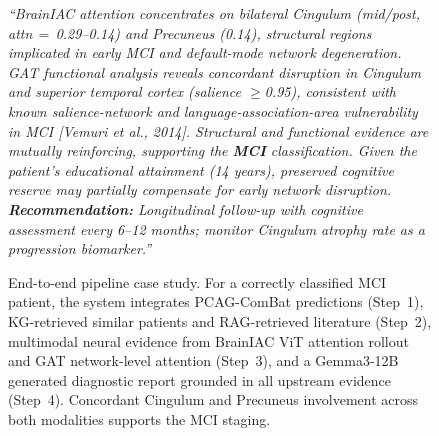 \begin{figure}[t]
\begin{tcolorbox}
\begin{tcolorbox}[
  enhanced, colframe=gray!50, colback=blue!3,
  title={\small\textbf{(4) Gemma3-12B Generated Report (excerpt, translated)}},
  coltitle=black, fonttitle=\small\bfseries,
  top=2pt, bottom=2pt, left=3pt, right=3pt, boxrule=0.4pt, arc=2pt]
\small\itshape
``BrainIAC attention concentrates on bilateral Cingulum (mid/post, attn$\,{=}\,$0.29--0.14)
and Precuneus (0.14), structural regions implicated in early MCI and default-mode network
degeneration. GAT functional analysis reveals concordant disruption in Cingulum and
superior temporal cortex (salience ${\geq}$0.95), consistent with known salience-network
and language-association-area vulnerability in MCI [Vemuri et al., 2014].
Structural and functional evidence are mutually reinforcing, supporting the
\textbf{MCI} classification.
Given the patient's educational attainment (14 years), preserved cognitive reserve may
partially compensate for early network disruption.
\textbf{Recommendation:} Longitudinal follow-up with cognitive assessment every 6--12 months;
monitor Cingulum atrophy rate as a progression biomarker.''
\end{tcolorbox}

\end{tcolorbox}

\caption{End-to-end pipeline case study. For a correctly classified MCI patient, the system
integrates PCAG-ComBat predictions (Step~1), KG-retrieved similar patients and
RAG-retrieved literature (Step~2), multimodal neural evidence from BrainIAC ViT
attention rollout and GAT network-level attention (Step~3), and a Gemma3-12B generated
diagnostic report grounded in all upstream evidence (Step~4).
Concordant Cingulum and Precuneus involvement across both modalities supports the MCI staging.}
\label{fig:casestudy}
\end{figure}
